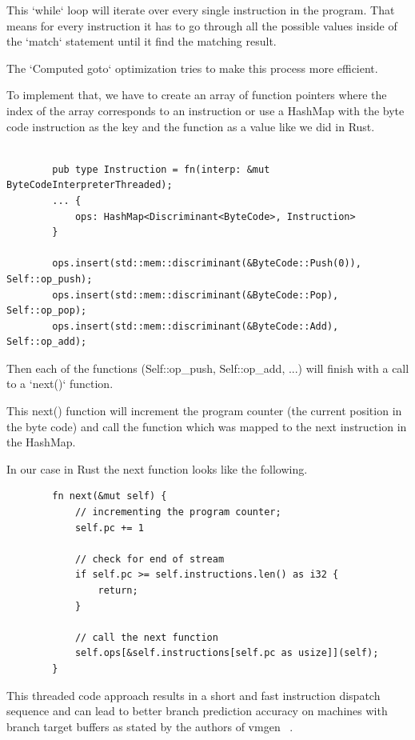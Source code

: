 \documentclass{article}
\begin{document}
\begin{enumerate}
        This `while` loop will iterate over every single instruction in the program. That means
        for every instruction it has to go through all the possible values inside of the `match`
        statement until it find the matching result.

        The `Computed goto` optimization tries to make this process more efficient.

        To implement that, we have to create an array of function pointers where
        the index of the array corresponds to an instruction or use a HashMap
        with the byte code instruction as the key and the function as a value
        like we did in Rust.

        \begin{verbatim}

        pub type Instruction = fn(interp: &mut ByteCodeInterpreterThreaded);
        ... {
            ops: HashMap<Discriminant<ByteCode>, Instruction>
        }

        ops.insert(std::mem::discriminant(&ByteCode::Push(0)), Self::op_push);
        ops.insert(std::mem::discriminant(&ByteCode::Pop), Self::op_pop);
        ops.insert(std::mem::discriminant(&ByteCode::Add), Self::op_add);
        \end{verbatim}

        Then each of the functions (Self::op\_push, Self::op\_add, ...) will finish
        with a call to a `next()` function.

        This next() function will increment the program counter (the current
        position in the byte code) and call the function which was mapped to
        the next instruction in the HashMap.

        In our case in Rust the next function looks like the following.

        \begin{verbatim}
        fn next(&mut self) {
            // incrementing the program counter;
            self.pc += 1 

            // check for end of stream
            if self.pc >= self.instructions.len() as i32 {
                return; 
            }

            // call the next function
            self.ops[&self.instructions[self.pc as usize]](self);
        }
        \end{verbatim}

        This threaded code approach results in a short and fast instruction
        dispatch sequence and can lead to better branch prediction accuracy on
        machines with branch target buffers as stated by the authors of vmgen ~\cite{vmgen}.

\end{enumerate}
\end{document}
